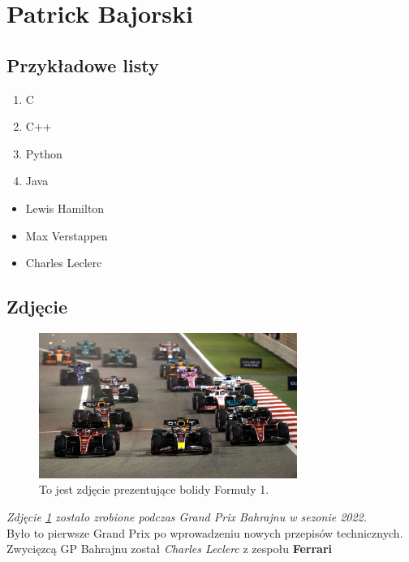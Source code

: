 \documentclass[a4paper]{article}
\begin{document}
\maketitle

\section{Patrick Bajorski}
\label{sec:Patrick Bajorski}

\subsection{Przykładowe listy}
\begin{enumerate}
\item C
\item C++
\item Python
\item Java
\end{enumerate}

\begin{itemize}
\item Lewis Hamilton
\item Max Verstappen
\item Charles Leclerc
\end{itemize}

\subsection{Zdjęcie}
\begin{figure}[h]
    \centering
    \includegraphics[width=0.75\textwidth]{pictures/F1.jpg}
    \caption{To jest zdjęcie prezentujące bolidy Formuły 1.}
    \label{fig:F11}
\end{figure}
\textit{Zdjęcie \ref{fig:F11} zostało zrobione podczas Grand Prix Bahrajnu w sezonie 2022.} \\ Było to pierwsze Grand Prix po wprowadzeniu nowych przepisów technicznych. \\ Zwycięzcą GP Bahrajnu został \emph{Charles Leclerc} z zespołu \textbf{Ferrari}
\end{document}
